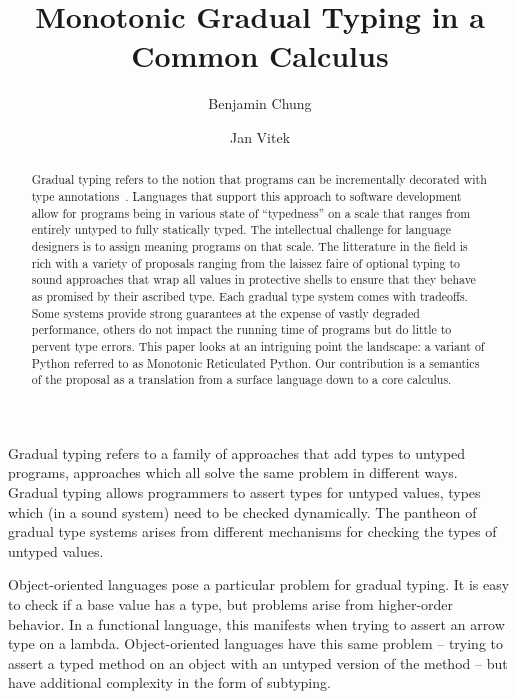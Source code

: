 \documentclass[sigconf]{acmart}
\begin{document}
\title{Monotonic Gradual Typing in a Common Calculus}
\subtitle{}

\author{Benjamin Chung}
\author{Jan Vitek}


\begin{abstract}
Gradual typing refers to the notion that programs can be incrementally
decorated with type annotations~\cite{SiekTaha06,tf-dls06}. Languages that
support this approach to software development allow for programs being in
various state of ``typedness'' on a scale that ranges from entirely untyped
to fully statically typed. The intellectual challenge for language designers
is to assign meaning programs on that scale. The litterature in the field is
rich with a variety of proposals ranging from the laissez faire of optional
typing to sound approaches that wrap all values in protective shells to
ensure that they behave as promised by their ascribed type. Each gradual
type system comes with tradeoffs. Some systems provide strong guarantees at
the expense of vastly degraded performance, others do not impact the running
time of programs but do little to pervent type errors. This paper looks at
an intriguing point the landscape: a variant of Python referred to as
Monotonic Reticulated Python. Our contribution is a semantics of the
proposal as a translation from a surface language down to a core calculus.
\end{abstract}



\maketitle

Gradual typing refers to a family of approaches that add types to untyped
programs, approaches which all solve the same problem in different ways.
Gradual typing allows programmers to assert types for untyped values, types
which (in a sound system) need to be checked dynamically. The pantheon of
gradual type systems arises from different mechanisms for checking the types
of untyped values.

Object-oriented languages pose a particular problem for gradual typing. It
is easy to check if a base value has a type, but problems arise from
higher-order behavior. In a functional language, this manifests when trying
to assert an arrow type on a lambda. Object-oriented languages have this
same problem -- trying to assert a typed method on an object with an untyped
version of the method -- but have additional complexity in the form of
subtyping.
\end{document}

